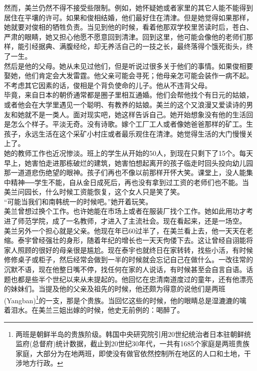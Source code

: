 然而，美兰仍然不得不接受些限制。例如，她怀疑她或者家里的其它人能不能得到居住在平壤的许可。如果和俊相结婚，他们最好住在清津。但是她觉得如果那样，她就要对俊相的牺牲负责。当见到他的时候，看着他那双学校里苦读时后，苍白、严肃的眼睛，她又担心他愿不愿意回到清津。回到这里，他可能会像他的老师们那样，能引经据典、满腹经纶，却无养活自己的一技之长，最终落得个饿死街头，终了一生。\\

然后是他的父母。她从未见过他们，但是听说过很多关于他们的事情。如果俊相要娶她，他们肯定会大发雷霆。他父亲可能会寻死；他母亲怎可能会装作一病不起。不考虑其它因素的话，俊相是个背负使命的儿子。他从不违背父母。\\

毕竟，来自日本的朝侨通常都是圈子里相互通婚。他们会帮他找个有日元的姑娘，或者他会在大学里遇见一个聪明、有教养的姑娘。美兰的这个又浪漫又爱读诗的男友和她就不是一类人。面对现实吧，她这样告诉自己。她开始想象没有他的生活回是怎么个样子。平淡无奇。没有诗歌。嫁个工厂工人或者像她爸爸那样的矿工。生孩子，永远生活在这个采矿小村庄或者最乐观住在清津。她觉得生活的大门慢慢关上了。\\

她的教师工作也近况惨淡。班上的学生从开始的50人，到现在只剩下了15个。每天早上，她害怕走进那栋破烂的建筑，她害怕想起离开的孩子临走时回头投向幼儿园那一道道悲伤绝望的眼神。孩子们再也不像以前那样开怀大笑。课堂上，没人能集中精神──学生不能，自从金日成死后，再也没有拿到过工资的老师们也不能。当美兰问园长，什么时候工资能恢复，这个女人只是笑了笑。\\

“可能当我们和南韩统一的时候吧。”她开着玩笑。\\

美兰曾想过换个工作。也许她能在市场上或者在服装厂找个工作。她如此用功才考进了师范学院，成了一名教师，才进入了主流社会。现在看起来，还是一场空。\\

美兰另外一个担心就是父亲。他现在年已60过半了，在美兰看上去，他一天天在老缩。泰宇曾经强壮的身形，随着年纪的增长也一天天佝偻下去。这让曾经自诩能将家人照顾的很好的母亲很是尴尬。现在泰宇也就终日在家转转，找些小活，有时候修修桌子或柜子，然后经常会做到一半的时候就会忘记自己在做什么。一改往常的沉默不语，现在他整日嘴不停，找任何在家的人说话，有时候甚至会自言自语。话题也都是些半个世纪以来从未提起的。他回忆在忠清南道度过的童年，还有他漂亮的妹妹们。当提及他的父亲及祖先的时候，他还颇为得意的说他们是两班(Yangban)\footnote{两班是朝鲜半岛的贵族阶级。韩国中央研究院引用20世纪统治者日本驻朝鲜统监府(总督府)统计数据，截止到20世纪30年代，一共有1685个家庭是两班贵族家庭，大部分为在地两班，即使没有做官依然控制所在地区的人口和土地，干涉地方行政。}的一支，那是个贵族。当回忆这些的时候，他的眼睛总是湿漉漉的噙着泪水。在美兰三姐出嫁的时候，他史无前例的：喝醉了。\\

